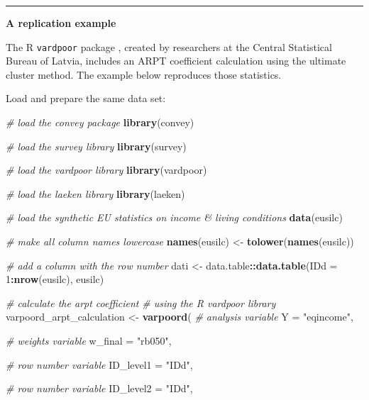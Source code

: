 \documentclass[
]{book}
\newenvironment{Shaded}{\begin{snugshade}}{\end{snugshade}}
\newcommand{\AttributeTok}[1]{\textcolor[rgb]{0.13,0.29,0.53}{#1}}
\newcommand{\CommentTok}[1]{\textcolor[rgb]{0.56,0.35,0.01}{\textit{#1}}}
\newcommand{\DecValTok}[1]{\textcolor[rgb]{0.00,0.00,0.81}{#1}}
\newcommand{\FunctionTok}[1]{\textcolor[rgb]{0.13,0.29,0.53}{\textbf{#1}}}
\newcommand{\NormalTok}[1]{#1}
\newcommand{\OtherTok}[1]{\textcolor[rgb]{0.56,0.35,0.01}{#1}}
\newcommand{\SpecialCharTok}[1]{\textcolor[rgb]{0.81,0.36,0.00}{\textbf{#1}}}
\newcommand{\StringTok}[1]{\textcolor[rgb]{0.31,0.60,0.02}{#1}}
\begin{document}
\begin{center}\rule{0.5\linewidth}{0.5pt}\end{center}

\textbf{A replication example}

The R \texttt{vardpoor} package \autocite{vardpoor}, created by researchers at the Central Statistical Bureau of Latvia, includes an ARPT coefficient calculation using the ultimate cluster method. The example below reproduces those statistics.

Load and prepare the same data set:

\begin{Shaded}
\begin{Highlighting}[]
\CommentTok{\# load the convey package}
\FunctionTok{library}\NormalTok{(convey)}

\CommentTok{\# load the survey library}
\FunctionTok{library}\NormalTok{(survey)}

\CommentTok{\# load the vardpoor library}
\FunctionTok{library}\NormalTok{(vardpoor)}

\CommentTok{\# load the laeken library}
\FunctionTok{library}\NormalTok{(laeken)}

\CommentTok{\# load the synthetic EU statistics on income \& living conditions}
\FunctionTok{data}\NormalTok{(eusilc)}

\CommentTok{\# make all column names lowercase}
\FunctionTok{names}\NormalTok{(eusilc) }\OtherTok{\textless{}{-}} \FunctionTok{tolower}\NormalTok{(}\FunctionTok{names}\NormalTok{(eusilc))}

\CommentTok{\# add a column with the row number}
\NormalTok{dati }\OtherTok{\textless{}{-}}\NormalTok{ data.table}\SpecialCharTok{::}\FunctionTok{data.table}\NormalTok{(}\AttributeTok{IDd =} \DecValTok{1}\SpecialCharTok{:}\FunctionTok{nrow}\NormalTok{(eusilc), eusilc)}

\CommentTok{\# calculate the arpt coefficient}
\CommentTok{\# using the R vardpoor library}
\NormalTok{varpoord\_arpt\_calculation }\OtherTok{\textless{}{-}}
  \FunctionTok{varpoord}\NormalTok{(}
    \CommentTok{\# analysis variable}
    \AttributeTok{Y =} \StringTok{"eqincome"}\NormalTok{,}
    
    \CommentTok{\# weights variable}
    \AttributeTok{w\_final =} \StringTok{"rb050"}\NormalTok{,}
    
    \CommentTok{\# row number variable}
    \AttributeTok{ID\_level1 =} \StringTok{"IDd"}\NormalTok{,}
    
    \CommentTok{\# row number variable}
    \AttributeTok{ID\_level2 =} \StringTok{"IDd"}\NormalTok{,}
    

\end{Highlighting}
\end{Shaded}
\end{document}
